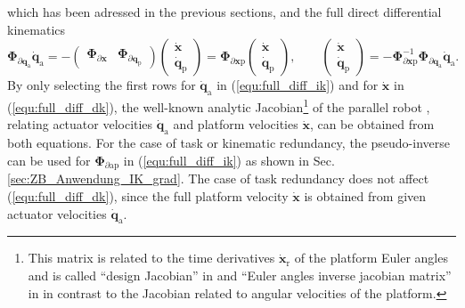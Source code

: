 \documentclass[robotics,article,submit,moreauthors,pdftex]{Definitions/mdpi}
\newcommand{\bm}[1]{\boldsymbol{#1}}
\begin{document}
%
which has been adressed in the previous sections, and the full direct differential kinematics
%
\begin{equation}
\bm{\Phi}_{\partial\bm{q}_{\mathrm{a}}} \dot{\bm{q}}_{\mathrm{a}} 
=
- 
\begin{pmatrix} \bm{\Phi}_{\partial\bm{x}} & \bm{\Phi}_{\partial\bm{q}_{\mathrm{p}}} \end{pmatrix}
\begin{pmatrix}
\dot{\bm{x}} \\
\dot{\bm{q}}_{\mathrm{p}}
\end{pmatrix}
=
\bm{\Phi}_{\partial\bm{x}\mathrm{p}}
\begin{pmatrix}
\dot{\bm{x}} \\
\dot{\bm{q}}_{\mathrm{p}}
\end{pmatrix},
\quad\quad
\begin{pmatrix}
\dot{\bm{x}} \\
\dot{\bm{q}}_{\mathrm{p}}
\end{pmatrix}
=
-\bm{\Phi}_{\partial\bm{x}\mathrm{p}}^{-1} \bm{\Phi}_{\partial\bm{q}_{\mathrm{a}}}
\dot{\bm{q}}_{\mathrm{a}}.
\label{equ:full_diff_dk}
\end{equation}
%
By only selecting the first rows for $\dot{\bm{q}}_{\mathrm{a}}$ in (\ref{equ:full_diff_ik}) and for $\dot{\bm{x}}$ in (\ref{equ:full_diff_dk}), the well-known analytic Jacobian\footnote{This matrix is related to the time derivatives $\dot{\bm{x}}_{\mathrm{r}}$ of the platform Euler angles and is called ``design Jacobian'' in \cite{Gogu2008} and ``Euler
angles inverse jacobian matrix'' in \cite{Merlet2006} in contrast to the Jacobian related to angular velocities of the platform.} of the parallel robot \cite{Merlet2006,Gogu2008}, relating actuator velocities $\dot{\bm{q}}_{\mathrm{a}}$ and platform velocities $\dot{\bm{x}}$, can be obtained from both equations.
For the case of task or kinematic redundancy, the pseudo-inverse can be used for $\bm{\Phi}_{\partial\mathrm{ap}}$ in (\ref{equ:full_diff_ik}) as shown in Sec.\,\ref{sec:ZB_Anwendung_IK_grad}.
The case of task redundancy does not affect (\ref{equ:full_diff_dk}), since the full platform velocity $\dot{\bm{x}}$ is obtained from given actuator velocities $\dot{\bm{q}}_{\mathrm{a}}$.

\end{document}
